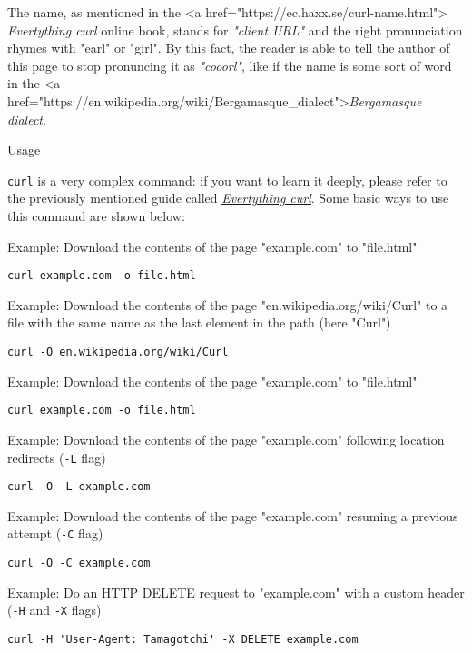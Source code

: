 \documentclass[hidelinks,12pt,a4paper,numbers=enddot]{scrartcl}
\begin{document}
The name, as mentioned in the <a href="https://ec.haxx.se/curl-name.html">
\emph{Evertything curl} online book, stands for \emph{"client URL"}
and the right pronunciation rhymes with "earl" or "girl". By this fact, the
reader is able to tell the author of this page to stop pronuncing it as
\emph{"cooorl"}, like if the name is some sort of word in the
<a href="https://en.wikipedia.org/wiki/Bergamasque\_dialect">\emph{Bergamasque
dialect}.

Usage

\texttt{curl} is a very complex command: if you want to learn it deeply,
please refer to the previously mentioned guide called
\underline{\href{https://ec.haxx.se/}{\emph{Evertything curl}}}. Some basic
ways to use this command are shown below:

Example: Download the contents of the page "example.com" to "file.html"

\begin{verbatim}
curl example.com -o file.html
\end{verbatim}

Example: Download the contents of the page "en.wikipedia.org/wiki/Curl" to
a file with the same name as the last element in the path (here "Curl")

\begin{verbatim}
curl -O en.wikipedia.org/wiki/Curl
\end{verbatim}

Example: Download the contents of the page "example.com" to "file.html"

\begin{verbatim}
curl example.com -o file.html
\end{verbatim}

Example: Download the contents of the page "example.com" following location
redirects (\texttt{-L} flag)

\begin{verbatim}
curl -O -L example.com
\end{verbatim}

Example: Download the contents of the page "example.com" resuming a previous attempt
(\texttt{-C} flag)

\begin{verbatim}
curl -O -C example.com
\end{verbatim}


Example: Do an HTTP DELETE request to "example.com" with a custom header
(\texttt{-H} and \texttt{-X} flags)

\begin{verbatim}
curl -H 'User-Agent: Tamagotchi' -X DELETE example.com
\end{verbatim}
\end{document}
